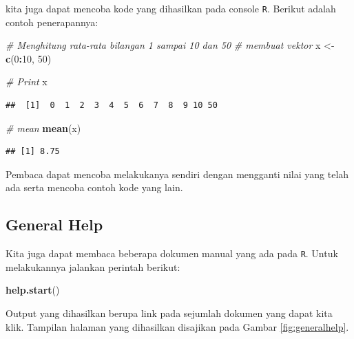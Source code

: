 \documentclass[
]{book}
\newenvironment{Shaded}{\begin{snugshade}}{\end{snugshade}}
\newcommand{\CommentTok}[1]{\textcolor[rgb]{0.56,0.35,0.01}{\textit{#1}}}
\newcommand{\DecValTok}[1]{\textcolor[rgb]{0.00,0.00,0.81}{#1}}
\newcommand{\FunctionTok}[1]{\textcolor[rgb]{0.13,0.29,0.53}{\textbf{#1}}}
\newcommand{\NormalTok}[1]{#1}
\newcommand{\OtherTok}[1]{\textcolor[rgb]{0.56,0.35,0.01}{#1}}
\newcommand{\SpecialCharTok}[1]{\textcolor[rgb]{0.81,0.36,0.00}{\textbf{#1}}}
\theoremstyle{definition}
\theoremstyle{definition}
\theoremstyle{definition}
\theoremstyle{definition}
\theoremstyle{remark}
\begin{document}
kita juga dapat mencoba kode yang dihasilkan pada console \texttt{R}. Berikut adalah contoh penerapannya:

\begin{Shaded}
\begin{Highlighting}[]
\CommentTok{\# Menghitung rata{-}rata bilangan 1 sampai 10 dan 50}
\CommentTok{\# membuat vektor}
\NormalTok{x }\OtherTok{\textless{}{-}} \FunctionTok{c}\NormalTok{(}\DecValTok{0}\SpecialCharTok{:}\DecValTok{10}\NormalTok{, }\DecValTok{50}\NormalTok{)}

\CommentTok{\# Print}
\NormalTok{x}
\end{Highlighting}
\end{Shaded}

\begin{verbatim}
##  [1]  0  1  2  3  4  5  6  7  8  9 10 50
\end{verbatim}

\begin{Shaded}
\begin{Highlighting}[]
\CommentTok{\# mean}
\FunctionTok{mean}\NormalTok{(x)}
\end{Highlighting}
\end{Shaded}

\begin{verbatim}
## [1] 8.75
\end{verbatim}

Pembaca dapat mencoba melakukanya sendiri dengan mengganti nilai yang telah ada serta mencoba contoh kode yang lain.

\hypertarget{generalhelp}{%
\subsection{General Help}\label{generalhelp}}

Kita juga dapat membaca beberapa dokumen manual yang ada pada \texttt{R}. Untuk melakukannya jalankan perintah berikut:

\begin{Shaded}
\begin{Highlighting}[]
\FunctionTok{help.start}\NormalTok{()}
\end{Highlighting}
\end{Shaded}

Output yang dihasilkan berupa link pada sejumlah dokumen yang dapat kita klik. Tampilan halaman yang dihasilkan disajikan pada Gambar \ref{fig:generalhelp}.
\end{document}
